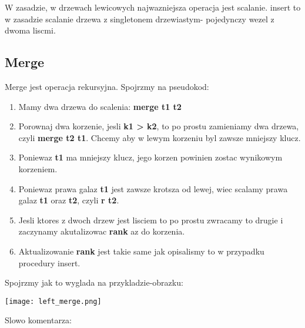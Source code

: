 \documentclass{article}
\begin{document}
W zasadzie, w drzewach lewicowych najwazniejsza operacja jest scalanie. insert to w zasadzie scalanie drzewa z singletonem drzewiastym- pojedynczy wezel z dwoma liscmi.

\subsection{Merge}

Merge jest operacja rekursyjna. Spojrzmy na pseudokod:

\begin{tcolorbox}[colback=white!90!blue,colframe=black!35!blue,title=]

    \begin{enumerate}[label=(\arabic*)]
        \item Mamy dwa drzewa do scalenia: \textbf{merge t1 t2}
        \item Porownaj dwa korzenie, jesli \textbf{k1 > k2}, to po prostu zamieniamy dwa drzewa, czyli \textbf{merge t2 t1}. Chcemy aby w lewym korzeniu byl zawsze mniejszy klucz.
        \item Poniewaz \textbf{t1} ma mniejszy klucz, jego korzen powinien zostac wynikowym korzeniem.
        \item Poniewaz prawa galaz \textbf{t1} jest zawsze krotsza od lewej, wiec scalamy prawa galaz \textbf{t1} oraz \textbf{t2}, czyli \textbf{r t2}.
        \item Jesli ktores z dwoch drzew jest lisciem to po prostu zwracamy to drugie i zaczynamy akutalizowac \textbf{rank} az do korzenia.
        \item Aktualizowanie \textbf{rank} jest takie same jak opisalismy to w przypadku procedury insert.

    \end{enumerate}

\end{tcolorbox}

\vspace{5cm}


Spojrzmy jak to wyglada na przykladzie-obrazku:

\begin{center}
    \begin{minipage}[h]{0.8\textwidth}
        \centering
        \texttt{[image: left\_merge.png]}
    \end{minipage}    
\end{center}

Slowo komentarza:
\end{document}
